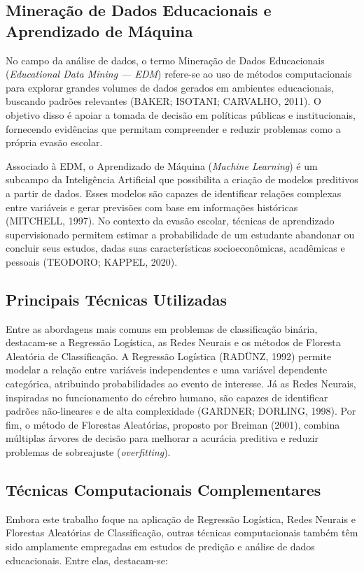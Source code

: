 \documentclass[english, spanish, brazilian]{RBIEarticle} %
\begin{document}
\subsection{Mineração de Dados Educacionais e Aprendizado de Máquina}
No campo da análise de dados, o termo Mineração de Dados Educacionais (\textit{Educational Data Mining — EDM}) refere-se ao uso de métodos computacionais para explorar grandes volumes de dados gerados em ambientes educacionais, buscando padrões relevantes (BAKER; ISOTANI; CARVALHO, 2011). O objetivo disso é apoiar a tomada de decisão em políticas públicas e institucionais, fornecendo evidências que permitam compreender e reduzir problemas como a própria evasão escolar.

Associado à EDM, o Aprendizado de Máquina (\textit{Machine Learning}) é um subcampo da Inteligência Artificial que possibilita a criação de modelos preditivos a partir de dados. Esses modelos são capazes de identificar relações complexas entre variáveis e gerar previsões com base em informações históricas (MITCHELL, 1997). No contexto da evasão escolar, técnicas de aprendizado supervisionado permitem estimar a probabilidade de um estudante abandonar ou concluir seus estudos, dadas suas características socioeconômicas, acadêmicas e pessoais (TEODORO; KAPPEL, 2020).

\subsection{Principais Técnicas Utilizadas}
Entre as abordagens mais comuns em problemas de classificação binária, destacam-se a Regressão Logística, as Redes Neurais e os métodos de Floresta Aleatória de Classificação. A Regressão Logística (RADÜNZ, 1992) permite modelar a relação entre variáveis independentes e uma variável dependente categórica, atribuindo probabilidades ao evento de interesse. Já as Redes Neurais, inspiradas no funcionamento do cérebro humano, são capazes de identificar padrões não-lineares e de alta complexidade (GARDNER; DORLING, 1998). Por fim, o método de Florestas Aleatórias, proposto por Breiman (2001), combina múltiplas árvores de decisão para melhorar a acurácia preditiva e reduzir problemas de sobreajuste (\textit{overfitting}).

\subsection{Técnicas Computacionais Complementares}
Embora este trabalho foque na aplicação de Regressão Logística, Redes Neurais e Florestas Aleatórias de Classificação, outras técnicas computacionais também têm sido amplamente empregadas em estudos de predição e análise de dados educacionais. Entre elas, destacam-se:
\end{document}
